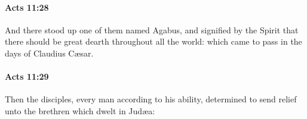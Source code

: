 		\paragraph{Acts 11:28} %
			\label{ACTS-11-28}

			And there stood up one of them named Agabus, and signified by the Spirit that there should be great dearth throughout all the world: which came to pass in the days of Claudius Cæsar.

			\begin{framed}
			\scriptsize
				\begin{compactdesc}
					\item[SBLG] 
				\end{compactdesc}
			\end{framed}

		\paragraph{Acts 11:29} %
			\label{ACTS-11-29}

			Then the disciples, every man according to his ability, determined to send relief unto the brethren which dwelt in Judæa:

